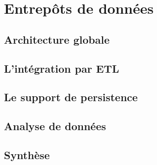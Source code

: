 \section{Entrepôts de données}
\subsection{Architecture globale}
\subsection{L'intégration par ETL}
\subsection{Le support de persistence}
\subsection{Analyse de données}
\subsection{Synthèse}